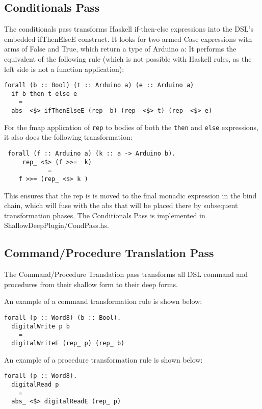 \documentclass[11pt, oneside]{article}   	%
\begin{document}
\subsection{Conditionals Pass}

The conditionals pass transforms Haskell if-then-else expressions into the DSL's
embedded ifThenElseE construct.  It looks for two armed Case expressions with
arms of False and True, which return a type of Arduino a:  It performs the equivalent
of the following rule (which is not possible with Haskell rules, as the left side is not
a function application):

\begin{verbatim}
forall (b :: Bool) (t :: Arduino a) (e :: Arduino a)
  if b then t else e
    =
  abs_ <$> ifThenElseE (rep_ b) (rep_ <$> t) (rep_ <$> e)
\end{verbatim}

For the fmap application of \verb+rep+ to bodies of both the \verb+then+ and
\verb+else+ expressions, it also does the following transformation:

\begin{verbatim}
 forall (f :: Arduino a) (k :: a -> Arduino b).
     rep_ <$> (f >>=  k)
            =
    f >>= (rep_ <$> k )
\end{verbatim}

This ensures that the rep is is moved to the final monadic expression in the bind chain,
which will fuse with the abs that will be placed there by subsequent transformation
phases.
The Conditionals Pass is implemented in ShallowDeepPlugin/CondPass.hs.

\subsection{Command/Procedure Translation Pass}

The Command/Procedure Translation pass transforms all DSL command and procedures from their 
shallow form to their deep forms.

An example of a command transformation rule is shown below:

\begin{verbatim}
forall (p :: Word8) (b :: Bool).  
  digitalWrite p b  
    =  
  digitalWriteE (rep_ p) (rep_ b)  
\end{verbatim}

An example of a procedure transformation rule is shown below:

\begin{verbatim}
forall (p :: Word8).
  digitalRead p 
    =  
  abs_ <$> digitalReadE (rep_ p)
 \end{verbatim}
\end{document}
